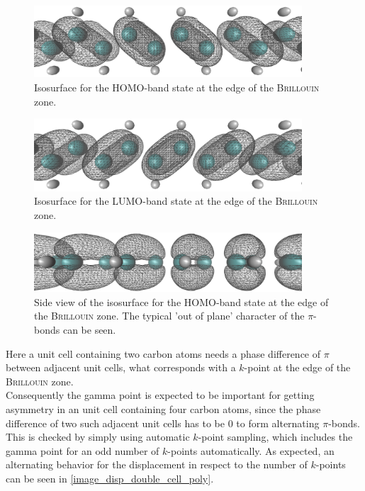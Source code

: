 \begin{figure}[!b]
	\centering
	\includegraphics[width = 10cm]{Images/polyacetylene/wavefunctions/Homo}
	\caption{Isosurface for the HOMO-band state at the edge of the \textsc{Brillouin} zone.}
	\label{image_homo1}
\end{figure}
\begin{figure}[!b]
	\centering
	\includegraphics[width = 10cm]{Images/polyacetylene/wavefunctions/LUMO}
	\caption{Isosurface for the LUMO-band state at the edge of the \textsc{Brillouin} zone.}
	\label{image_lumo1}
\end{figure}
\begin{figure}[!b]
	\centering
	\includegraphics[width = 10cm]{Images/polyacetylene/wavefunctions/HOMO_Side_View}
	\caption{Side view of the isosurface for the HOMO-band state at the edge of the \textsc{Brillouin} zone. The typical 'out of plane' character of the $\pi$-bonds can be seen.}
	\label{image_homo1_side_view}
\end{figure}
Here a unit cell containing two carbon atoms needs a phase difference of $\pi$ between adjacent unit cells, what corresponds with a $k$-point at the edge of the \textsc{Brillouin} zone.\\
Consequently the gamma point is expected to be important for getting asymmetry in an unit cell containing four carbon atoms, since the phase difference of two such adjacent unit cells has to be $0$ to form alternating $\pi$-bonds. This is checked by simply using automatic $k$-point sampling, which includes the gamma point for an odd number of $k$-points automatically. As expected, an alternating behavior for the displacement in respect to the number of $k$-points can be seen in \cref{image_disp_double_cell_poly}.\\
